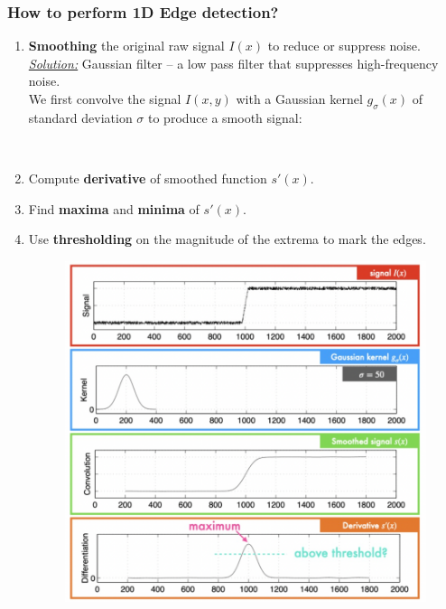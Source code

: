 \documentclass[a4paper,11pt]{article}
\begin{document}
\subsubsection{How to perform 1D Edge detection?}
\begin{enumerate}
	\item \textbf{Smoothing} the original raw signal $I(x)$ to reduce or suppress noise. \\
	\underline{\textit{Solution:}} Gaussian filter -- a low pass filter that suppresses high-frequency noise.\\
	We first convolve the signal $I(x,y)$ with a Gaussian kernel $g_\sigma (x)$ of standard deviation $\sigma$ to produce a smooth signal:
	\begin{center}
		\vspace{5pt}\\
	\end{center}
	\item Compute \textbf{derivative} of smoothed function $s'(x)$.
	\item Find \textbf{maxima} and \textbf{minima} of $s'(x)$.
	\item Use \textbf{thresholding} on the magnitude of the extrema to mark the edges.
	\begin{figure}[h]
		\centering
		\includegraphics[width=0.8\linewidth]{figures/1Dedge.png}
	\end{figure}
\end{enumerate}
\end{document}
